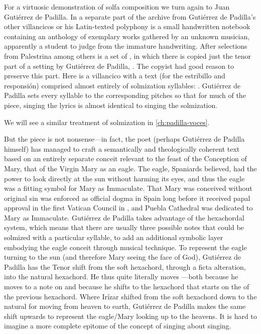 For a virtuosic demonstration of solfa composition we turn again to Juan
Gutiérrez de Padilla.
In a separate part of the archive from Gutiérrez de Padilla's other villancicos
or his Latin-texted polyphony is a small handwritten notebook containing an
anthology of exemplary works gathered by an unknown musician, apparently a
student to judge from the immature handwriting.
After selections from Palestrina among others is a set of , in which there is copied just the tenor part of a setting
by Gutiérrez de Padilla, .%
The copyist had good reason to preserve this part.
Here is a villancico with a text (for the estribillo and responsión) comprised
almost entirely of solmization syllables:  .
Gutiérrez de Padilla sets every syllable to the corresponding pitches so that
for much of the piece, singing the lyrics is almost identical to singing the
solmization.%
\begin{Footnote}
    We will see a similar treatment of solmization in \cref{ch:padilla-voces}.
\end{Footnote}
But the piece is not nonsense---in fact, the poet (perhaps Gutiérrez de Padilla
himself) has managed to craft a semantically and theologically coherent text
based on an entirely separate conceit relevant to the feast of the Conception
of Mary, that of the Virgin Mary as an eagle.
The eagle, Spaniards believed, had the power to look directly at the sun
without harming its eyes, and thus the eagle was a fitting symbol for Mary as
Immaculate.%
That Mary was conceived without original sin was enforced as official dogma in
Spain long before it received papal approval in the first Vatican Council in
\XXX[18XX], and Puebla Cathedral was dedicated to Mary as Immaculate.
Gutiérrez de Padilla takes advantage of the hexachordal system, which means
that there are usually three possible notes that could be solmized with a
particular syllable, to add an additional symbolic layer embodying the eagle
conceit through musical technique.
To represent the eagle turning to the sun (and therefore Mary seeing the face
of God\XXX[?]), Gutiérrez de Padilla has the Tenor shift from the soft
hexachord, through a ficta alteration, into the natural hexachord. 
He thus quite literally moves ---both because he moves to a
note on  and because he shifts to the hexachord that starts on the
 of the previous hexachord.
Where Irízar shifted from the soft hexachord down to the natural for moving from
heaven to earth, Gutiérrez de Padilla makes the same shift upwards to represent
the eagle/Mary looking up to the heavens.
It is hard to imagine a more complete epitome of the concept of singing about
singing.

